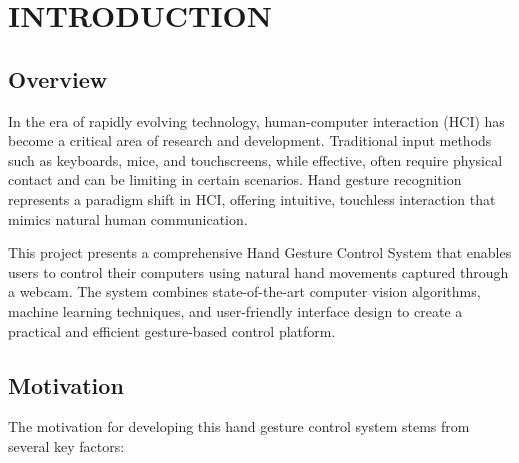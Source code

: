 \documentclass[12pt,a4paper]{report}
\begin{document}
\setcounter{page}{1}
\pagestyle{fancy}

\newpage
\tableofcontents

\newpage
\listoffigures

\newpage
\listoftables

\newpage
\pagestyle{fancy}
\setcounter{page}{1}

\chapter{INTRODUCTION}

\section{Overview}

In the era of rapidly evolving technology, human-computer interaction (HCI) has become a critical area of research and development. Traditional input methods such as keyboards, mice, and touchscreens, while effective, often require physical contact and can be limiting in certain scenarios. Hand gesture recognition represents a paradigm shift in HCI, offering intuitive, touchless interaction that mimics natural human communication.

This project presents a comprehensive Hand Gesture Control System that enables users to control their computers using natural hand movements captured through a webcam. The system combines state-of-the-art computer vision algorithms, machine learning techniques, and user-friendly interface design to create a practical and efficient gesture-based control platform.

\section{Motivation}

The motivation for developing this hand gesture control system stems from several key factors:
\end{document}
